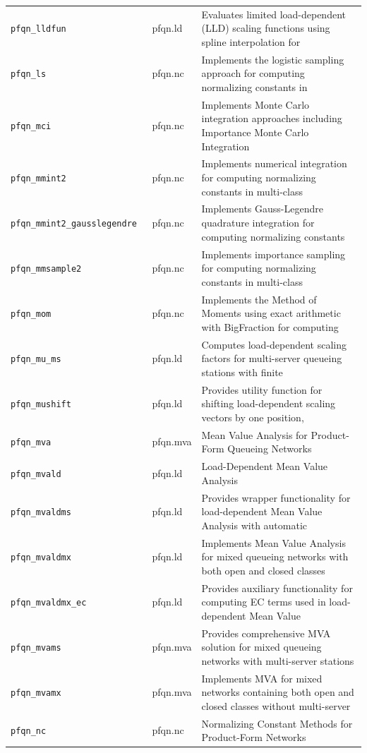 \begin{footnotesize}
\begin{longtable}{|p{0.4\linewidth}|p{0.1\linewidth}|p{0.5\linewidth}|}
\texttt{pfqn\_lldfun} & pfqn.ld & Evaluates limited load-dependent (LLD) scaling functions using spline interpolation for\\
\texttt{pfqn\_ls} & pfqn.nc & Implements the logistic sampling approach for computing normalizing constants in\\
\texttt{pfqn\_mci} & pfqn.nc & Implements Monte Carlo integration approaches including Importance Monte Carlo Integration\\
\texttt{pfqn\_mmint2} & pfqn.nc & Implements numerical integration for computing normalizing constants in multi-class\\
\texttt{pfqn\_mmint2\_gausslegendre} & pfqn.nc & Implements Gauss-Legendre quadrature integration for computing normalizing constants\\
\texttt{pfqn\_mmsample2} & pfqn.nc & Implements importance sampling for computing normalizing constants in multi-class\\
\texttt{pfqn\_mom} & pfqn.nc & Implements the Method of Moments using exact arithmetic with BigFraction for computing\\
\texttt{pfqn\_mu\_ms} & pfqn.ld & Computes load-dependent scaling factors for multi-server queueing stations with finite\\
\texttt{pfqn\_mushift} & pfqn.ld & Provides utility function for shifting load-dependent scaling vectors by one position,\\
\texttt{pfqn\_mva} & pfqn.mva & Mean Value Analysis for Product-Form Queueing Networks\\
\texttt{pfqn\_mvald} & pfqn.ld & Load-Dependent Mean Value Analysis\\
\texttt{pfqn\_mvaldms} & pfqn.ld & Provides wrapper functionality for load-dependent Mean Value Analysis with automatic\\
\texttt{pfqn\_mvaldmx} & pfqn.ld & Implements Mean Value Analysis for mixed queueing networks with both open and closed classes\\
\texttt{pfqn\_mvaldmx\_ec} & pfqn.ld & Provides auxiliary functionality for computing EC terms used in load-dependent Mean Value\\
\texttt{pfqn\_mvams} & pfqn.mva & Provides comprehensive MVA solution for mixed queueing networks with multi-server stations\\
\texttt{pfqn\_mvamx} & pfqn.mva & Implements MVA for mixed networks containing both open and closed classes without multi-server\\
\texttt{pfqn\_nc} & pfqn.nc & Normalizing Constant Methods for Product-Form Networks\\

\end{longtable}
\end{footnotesize}
